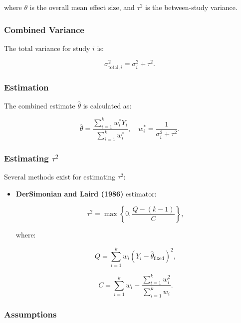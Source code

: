 \documentclass[12pt,a4paper]{report}
\begin{document}
where $\theta$ is the overall mean effect size, and $\tau^2$ is the between-study variance.

\subsubsection{Combined Variance}
\label{subsubsec:combined_variance}

The total variance for study $i$ is:

\begin{equation}
\label{eq:total_variance}
\sigma_{\text{total}, i}^2 = \sigma_i^2 + \tau^2.
\end{equation}

\subsubsection{Estimation}
\label{subsubsec:random_estimation}

The combined estimate $\hat{\theta}$ is calculated as:

\begin{equation}
\label{eq:random_effect_estimate}
\hat{\theta} = \frac{\sum_{i=1}^k w_i^* Y_i}{\sum_{i=1}^k w_i^*}, \quad w_i^* = \frac{1}{\sigma_i^2 + \tau^2}.
\end{equation}

\subsubsection{Estimating $\tau^2$}
\label{subsubsec:estimating_tau2}

Several methods exist for estimating $\tau^2$:

\begin{itemize}
    \item \textbf{DerSimonian and Laird (1986)} estimator:

    \begin{equation}
    \label{eq:dl_tau2}
    \tau^2 = \max\left\{0, \frac{Q - (k - 1)}{C}\right\},
    \end{equation}

    where:

    \[
    Q = \sum_{i=1}^k w_i (Y_i - \hat{\theta}_{\text{fixed}})^2,
    \]

    \[
    C = \sum_{i=1}^k w_i - \frac{\sum_{i=1}^k w_i^2}{\sum_{i=1}^k w_i}.
    \]
\end{itemize}

\subsubsection{Assumptions}
\label{subsubsec:random_assumptions}
\end{document}
